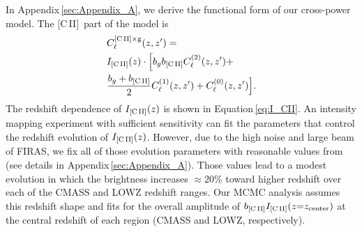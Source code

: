 \documentclass[fleqn,usenatbib]{mnras}
\newcommand{\cii}{[C{\sc\,II}]}
\begin{document}
In Appendix\,\ref{sec:Appendix_A}, we derive the functional form of our cross-power model. The \cii\ part of the model is
\begin{equation}\label{eq:cii_cl_full_orig}
\begin{split}
&C_{\ell}^{\rm \cii \times g}(z,z') = \\
&I_{\rm \cii}(z) \cdot \Big[ b_gb_{\rm \cii}C^{(2)}_{\ell}(z,z') + \\ &\frac{b_g + b_{\rm \cii}}{2}C^{(1)}_{\ell}(z,z') + C^{(0)}_{\ell}(z,z') \Big]. 
\end{split}
\end{equation}
The redshift dependence of $I_{\rm \cii}(z)$ is shown in Equation\,\ref{eq:I_CII}. An intensity mapping experiment with sufficient sensitivity can fit the parameters that control the redshift evolution of $I_{\rm \cii}(z)$. However, due to the high noise and large beam of FIRAS, we fix all of those evolution parameters with reasonable values from \cite{pullen2018search} (see details in Appendix\,\ref{sec:Appendix_A}). Those values lead to a modest evolution in which the brightness increases ${\approx}20\%$ toward higher redshift over each of the CMASS and LOWZ redshift ranges. Our MCMC analysis assumes this redshift shape and fits for the overall amplitude of $b_{\rm \cii}I_{\rm \cii}(z{=}z_{\rm center})$ at the central redshift of each region (CMASS and LOWZ, respectively).
\end{document}
